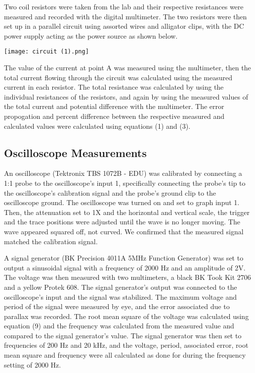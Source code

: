 \documentclass[twoside,10pt]{article}
\begin{document}
\begin{multicols}{2}
		\indent Two coil resistors were taken from the lab and their respective resistances were measured and recorded with the digital multimeter. The two resistors were then set up in a parallel circuit using assorted wires and alligator clips, with the DC power supply acting as the power source as shown below.
		
		\begin{center}
		\texttt{[image: circuit (1).png]}
		\end{center}
		
		 The value of the current at point A was measured using the multimeter, then the total current flowing through the circuit was calculated using the measured current in each resistor. The total resistance was calculated by using the individual resistances of the resistors, and again by using the measured values of the total current and potential difference with the multimeter. The error propogation and percent difference between the respective measured and calculated values were calculated using equations (1) and (3). 

		
		\subsection{Oscilloscope Measurements}
		An oscilloscope (Tektronix TBS 1072B - EDU) was calibrated by connecting a 1:1 probe to the oscilloscope's input 1, specifically connecting the probe's tip to the oscilloscope's calibration signal and the probe's ground clip to the oscilloscope ground. The oscilloscope was turned on and set to graph input 1. Then, the attenuation set to 1X and the horizontal and vertical scale, the trigger and the trace positions were adjusted until the wave is no longer moving. The wave appeared squared off, not curved. We confirmed that the measured signal matched the calibration signal. 
		
		\indent A signal generator (BK Precision 4011A 5MHz Function Generator) was set to output a sinusoidal signal with a frequency of 2000 Hz and an amplitude of 2V. The voltage was then measured with two multimeters, a black BK Took Kit 2706 and a yellow Protek 608. The signal generator's output was connected to the oscilloscope's input and the signal was stabilized. The maximum voltage and period of the signal were measured by eye, and the error associated due to parallax was recorded. The root mean square of the voltage was calculated using equation (9) and the frequency was calculated from the measured value and compared to the signal generator's value. The signal generator was then set to frequencies of 200 Hz and 20 kHz, and the voltage, period, associated error, root mean square and frequency were all calculated as done for during the frequency setting of 2000 Hz. 
		

\end{multicols}
\end{document}
